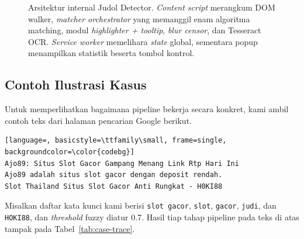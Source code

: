 \documentclass[11pt,a4paper]{article}
\begin{document}
\begin{figure}[H]
    \caption{Arsitektur internal Judol Detector. \textit{Content script} merangkum DOM walker, \textit{matcher orchestrator}
    yang memanggil enam algoritma matching, modul \textit{highlighter + tooltip}, \textit{blur censor}, dan Tesseract OCR.
    \textit{Service worker} memelihara \textit{state} global, sementara popup menampilkan statistik beserta tombol kontrol.}
    \label{fig:detailed-arch}
\end{figure}

\subsection{Contoh Ilustrasi Kasus}

Untuk memperlihatkan bagaimana pipeline bekerja secara konkret, kami ambil contoh teks dari halaman pencarian Google berikut.

\begin{lstlisting}[language=, basicstyle=\ttfamily\small, frame=single, backgroundcolor=\color{codebg}]
Ajo89: Situs Slot Gacor Gampang Menang Link Rtp Hari Ini
Ajo89 adalah situs slot gacor dengan deposit rendah.
Slot Thailand Situs Slot Gacor Anti Rungkat - H0KI88
\end{lstlisting}

Misalkan daftar kata kunci kami berisi \texttt{slot gacor}, \texttt{slot}, \texttt{gacor}, \texttt{judi}, dan \texttt{HOKI88},
dan \textit{threshold} fuzzy diatur 0.7. Hasil tiap tahap pipeline pada teks di atas tampak pada
Tabel~\ref{tab:case-trace}.
\end{document}

